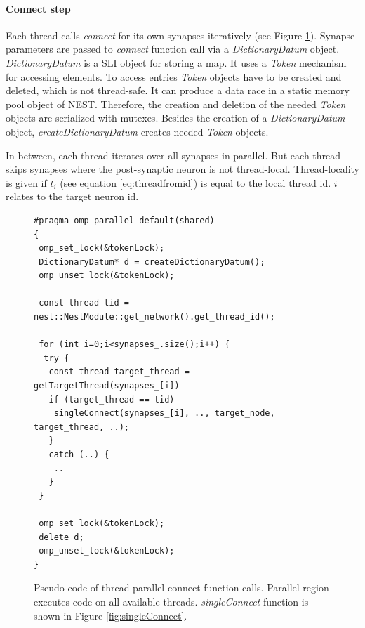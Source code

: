 \paragraph{Connect step}
Each thread calls \emph{connect} for its own synapses iteratively (see Figure \ref{fig:iterateConnect}).
Synapse parameters are passed to \emph{connect} function call via a \emph{DictionaryDatum} object.
\emph{DictionaryDatum} is a SLI object for storing a map.
It uses a \emph{Token} mechanism for accessing elements.
To access entries \emph{Token} objects have to be created and deleted,
which is not thread-safe. It can produce a data race in a static memory pool object of NEST.
Therefore, the creation and deletion of the needed \emph{Token} objects are serialized with mutexes.
Besides the creation of a \emph{DictionaryDatum} object, \emph{createDictionaryDatum} creates needed \emph{Token} objects.

In between, each thread iterates over all synapses in parallel.
But each thread skips synapses where the post-synaptic neuron is not thread-local.
Thread-locality is given if $t_i$ (see equation \ref{eq:threadfromid}) is equal to the local thread id.
$i$ relates to the target neuron id.
\begin{figure}[ht!]
\begin{lstlisting}[style=cppcode]
#pragma omp parallel default(shared)
{ 
 omp_set_lock(&tokenLock);
 DictionaryDatum* d = createDictionaryDatum();  
 omp_unset_lock(&tokenLock);

 const thread tid = nest::NestModule::get_network().get_thread_id();
      
 for (int i=0;i<synapses_.size();i++) {
  try {
   const thread target_thread = getTargetThread(synapses_[i])
   if (target_thread == tid)
    singleConnect(synapses_[i], .., target_node, target_thread, ..);
   }
   catch (..) {
    ..
   }
 }
  
 omp_set_lock(&tokenLock);
 delete d;  
 omp_unset_lock(&tokenLock);
}
\end{lstlisting}
\caption[Pseudo code of thread parallel connect function calls]{Pseudo code of thread parallel connect function calls.
Parallel region executes code on all available threads.
\emph{singleConnect} function is shown in Figure \ref{fig:singleConnect}.
}
\label{fig:iterateConnect}
\end{figure}

